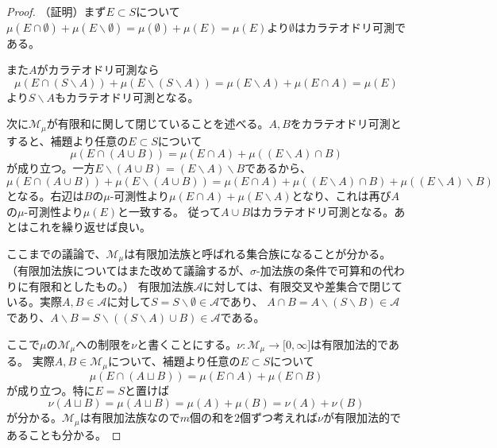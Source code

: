 \documentclass[../root.tex]{subfiles}
\begin{document}
\begin{proof}
（証明）まず$ E\subset S $について$ \mu( E\cap\emptyset )+\mu( E\backslash\emptyset )=\mu( \emptyset )+\mu( E )=\mu( E ) $より$ \emptyset $はカラテオドリ可測である。

また$ A $がカラテオドリ可測なら
\[ \mu( E\cap( S\backslash A ) )+\mu( E\backslash( S\backslash A ) ) = \mu( E\backslash A )+\mu( E\cap A )=\mu( E ) \]
より$ S\backslash A $もカラテオドリ可測となる。

次に$ \mathscr{M}_{\mu} $が有限和に関して閉じていることを述べる。$ A, B $をカラテオドリ可測とすると、補題より任意の$ E\subset S $について
\[ \mu( E\cap( A\cup B ) ) = \mu( E\cap A )+\mu( ( E\backslash A )\cap B ) \]
が成り立つ。一方$ E\backslash( A\cup B )=(E\backslash A )\backslash B $であるから、
\[ \mu( E\cap ( A\cup B ) )+\mu( E\backslash( A\cup B ) ) = \mu( E\cap A )+\mu( ( E\backslash A )\cap B )+\mu( ( E\backslash A )\backslash B ) \]
となる。右辺は$ B $の$ \mu $-可測性より$ \mu( E\cap A )+\mu( E\backslash A) $となり、これは再び$ A $の$ \mu $-可測性より$ \mu( E ) $と一致する。
従って$ A\cup B $はカラテオドリ可測となる。あとはこれを繰り返せば良い。

ここまでの議論で、$ \mathscr{M}_{\mu} $は有限加法族と呼ばれる集合族になることが分かる。（有限加法族についてはまた改めて議論するが、$ \sigma $-加法族の条件で可算和の代わりに有限和としたもの。）
有限加法族$ \mathscr{A} $に対しては、有限交叉や差集合で閉じている。実際$ A, B\in\mathscr{A} $に対して$ S=S\backslash \emptyset\in\mathscr{A} $であり、
$ A\cap B=A\backslash( S\backslash B )\in\mathscr{A} $であり、$ A\backslash B=S\backslash( ( S\backslash A )\cup B )\in\mathscr{A} $である。

ここで$ \mu $の$ \mathscr{M}_{\mu} $への制限を$ \nu $と書くことにする。$ \nu\colon\mathscr{M}_{\mu}\rightarrow\lbrack 0, \infty \rbrack $は有限加法的である。
実際$ A, B\in\mathscr{M}_{\mu} $について、補題より任意の$ E\subset S $について
\[ \mu( E\cap( A\sqcup B ) ) = \mu( E\cap A )+\mu( E\cap B ) \]
が成り立つ。特に$ E= S $と置けば
\[ \nu( A\sqcup B )=\mu( A\sqcup B )=\mu( A )+\mu( B )=\nu( A )+\nu( B ) \]
が分かる。$ \mathscr{M}_{\mu} $は有限加法族なので$ m $個の和を$ 2 $個ずつ考えれば$ \nu $が有限加法的であることも分かる。


\end{proof}
\end{document}

